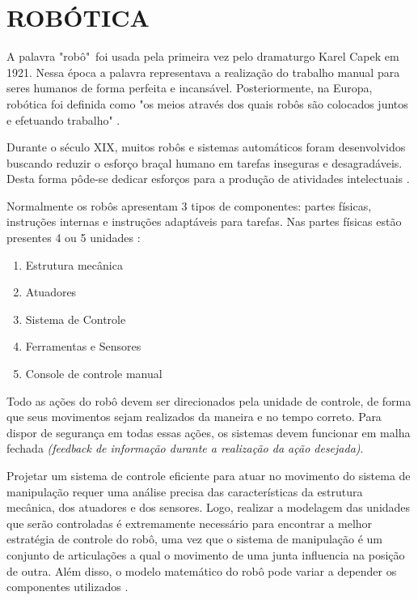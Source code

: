 \documentclass[12pt,oneside,a4paper, chapter=TITLE, section = TITLE, english, brazil]{abntex2}
\begin{document}

\chapter{ROBÓTICA}

A palavra "robô"\ foi usada pela primeira vez pelo dramaturgo Karel Capek em 1921. Nessa época a palavra representava a realização do trabalho manual para seres humanos de forma perfeita e incansável. Posteriormente, na Europa, robótica foi definida como "os meios através dos quais robôs são colocados juntos e efetuando trabalho" \cite{fuller}.

Durante o século XIX, muitos robôs e sistemas automáticos foram desenvolvidos buscando reduzir o esforço braçal humano em tarefas inseguras e desagradáveis. Desta forma pôde-se dedicar esforços para a produção de atividades intelectuais \cite{silveira}.

Normalmente os robôs apresentam 3 tipos de componentes: partes físicas, instruções internas e instruções adaptáveis para tarefas. Nas partes físicas estão presentes 4 ou 5 unidades \cite{fuller}:

\begin{enumerate}

\item Estrutura mecânica

\item Atuadores

\item Sistema de Controle 

\item Ferramentas e Sensores

\item Console de controle manual

\end{enumerate}

Todo as ações do robô devem ser direcionados pela unidade de controle, de forma que seus movimentos sejam realizados da maneira e no tempo correto. Para dispor de segurança em todas essas ações, os sistemas devem funcionar em malha fechada \textit{(feedback de informação durante a realização da ação desejada)}.

Projetar um sistema de controle eficiente para atuar no movimento do sistema de manipulação requer uma análise precisa das características da estrutura mecânica, dos atuadores e dos sensores. Logo, realizar a modelagem das unidades que serão controladas é extremamente necessário para encontrar a melhor estratégia de controle do robô, uma vez que o sistema de manipulação é um conjunto de articulações a qual o movimento de uma junta influencia na posição de outra. Além disso, o modelo matemático do robô pode variar a depender os componentes utilizados \cite{sciavicco}.
\end{document}
